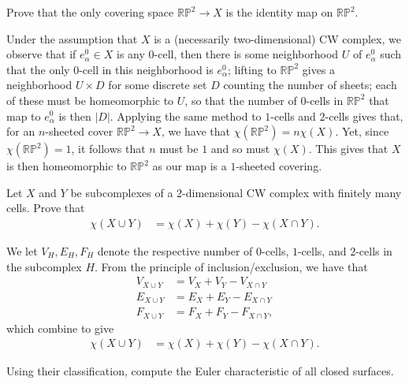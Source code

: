 \documentclass[10pt]{mypackage}
\begin{document}
\RaggedRight
\begin{problem}[Problem 1]
  Prove that the only covering space $ \mathbb{RP}^2\rightarrow X $ is the identity map on $ \mathbb{RP}^2 $.
\end{problem}
\begin{solution}
  Under the assumption that $X$ is a (necessarily two-dimensional) CW complex, we observe that if $e^{0}_{\alpha}\in X$ is any $0$-cell, then there is some neighborhood $U$ of $e^0_{\alpha}$ such that the only $0$-cell in this neighborhood is $e^0_{\alpha}$; lifting to $ \mathbb{RP}^2 $ gives a neighborhood $U\times D$ for some discrete set $D$ counting the number of sheets; each of these must be homeomorphic to $U$, so that the number of $0$-cells in $ \mathbb{RP}^2 $ that map to $e^0_{\alpha}$ is then $ \left\vert D \right\vert $. Applying the same method to $1$-cells and $2$-cells gives that, for an $n$-sheeted cover $ \mathbb{RP}^2\rightarrow X $, we have that $\chi\left( \mathbb{RP}^2 \right) = n \chi\left( X \right)$. Yet, since $ \chi\left( \mathbb{RP}^2 \right) = 1 $, it follows that $n$ must be $1$ and so must $\chi(X)$. This gives that $X$ is then homeomorphic to $ \mathbb{RP}^2 $ as our map is a $1$-sheeted covering.
\end{solution}
\begin{problem}[Problem 2]
  Let $X$ and $Y$ be subcomplexes of a $2$-dimensional CW complex with finitely many cells. Prove that
  \begin{align*}
    \chi\left( X\cup Y \right) &= \chi\left( X \right) + \chi\left( Y \right) - \chi\left( X\cap Y \right).
  \end{align*}
\end{problem}
\begin{solution}
  We let $V_H, E_H,F_H$ denote the respective number of $0$-cells, $1$-cells, and $2$-cells in the subcomplex $H$. From the principle of inclusion/exclusion, we have that
  \begin{align*}
    V_{X\cup Y} &= V_X + V_Y - V_{X\cap Y}\\
    E_{X\cup Y} &= E_X + E_Y - E_{X\cap Y}\\
    F_{X\cup Y} &= F_X + F_Y - F_{X\cap Y},
  \end{align*}
  which combine to give
  \begin{align*}
    \chi\left( X\cup Y \right) &= \chi\left( X \right) + \chi\left( Y \right) - \chi\left( X\cap Y \right).
  \end{align*}
\end{solution}
\begin{problem}[Problem 3]
  Using their classification, compute the Euler characteristic of all closed surfaces.
\end{problem}
\end{document}
